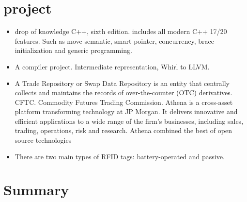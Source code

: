 \documentclass[a4paper,11pt,twoside]{book}
\begin{document}
\chapter{project}
\begin{itemize}
	\item drop of knowledge C++, sixth edition. includes all modern C++ 17/20 features. Such as move semantic,  smart pointer, concurrency, brace initialization and generic programming. 
	
	\item A compiler project. Intermediate representation, Whirl to LLVM. 
	
	\item A Trade Repository or Swap Data Repository is an entity that centrally collects and maintains the records of over-the-counter (OTC) derivatives. CFTC. Commodity Futures Trading Commission.   Athena is a cross-asset platform transforming technology at JP Morgan. It delivers innovative and efficient applications to a wide range of the firm's businesses, including sales, trading, operations, risk and research. Athena combined the best of open source technologies
	
	\item There are two main types of RFID tags: battery-operated and passive. 
	
\end{itemize}

\iffalse

\chapter{Summary}
\end{document}
